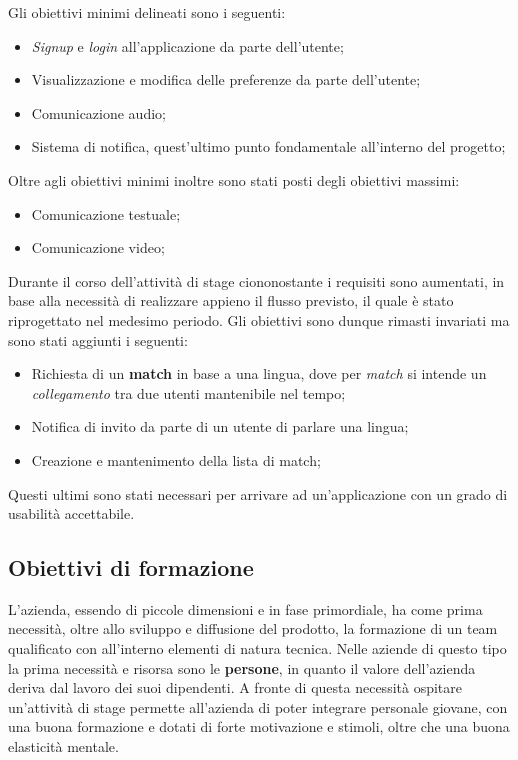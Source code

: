 Gli obiettivi minimi delineati sono i seguenti:

\begin{itemize}

\item \textit{Signup} e \textit{login} all'applicazione da parte dell'utente;
\item Visualizzazione e modifica delle preferenze da parte dell'utente;
\item Comunicazione audio;
\item Sistema di notifica, quest'ultimo punto fondamentale all'interno del progetto;

\end{itemize}

Oltre agli obiettivi minimi inoltre sono stati posti degli obiettivi massimi:

\begin{itemize}

\item Comunicazione testuale;
\item Comunicazione video;

\end{itemize}

Durante il corso dell'attività di stage ciononostante i requisiti sono aumentati, in base alla necessità di realizzare appieno il flusso previsto, il quale è stato riprogettato nel medesimo periodo. Gli obiettivi sono dunque rimasti invariati ma sono stati aggiunti i seguenti:

\begin{itemize}

\item Richiesta di un \textbf{match} in base a una lingua, dove per \textit{match} si intende un \textit{collegamento} tra due utenti mantenibile nel tempo;
\item Notifica di invito da parte di un utente di parlare una lingua;
\item Creazione e mantenimento della lista di match;

\end{itemize}

Questi ultimi sono stati necessari per arrivare ad un'applicazione con un grado di usabilità accettabile.

\subsection{Obiettivi di formazione}

L'azienda, essendo di piccole dimensioni e in fase primordiale, ha come prima necessità, oltre allo sviluppo e diffusione del prodotto, la formazione di un team qualificato con all'interno elementi di natura tecnica.  Nelle aziende di questo tipo la prima necessità e risorsa sono le \textbf{persone}, in quanto il valore dell'azienda deriva dal lavoro dei suoi dipendenti. A fronte di questa necessità ospitare un'attività di stage permette all'azienda di poter integrare personale giovane, con una buona formazione e dotati di forte motivazione e stimoli, oltre che una buona elasticità mentale. 

